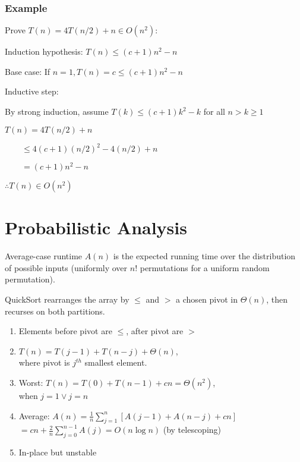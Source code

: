 \documentclass[12pt, a4paper]{article}
\begin{document}
\begin{multicols*}{3}
\subsubsection{Example}

Prove $T(n) = 4T(n /2) + n \in O(n^2)$:\\
\begin{enumproof}
\item Induction hypothesis: $T(n) \leq (c+1)n^2-n$
\item Base case: If $n = 1, T(n) = c \leq (c+1)n^2-n$
\item Inductive step: 
  \begin{enumproof}
  \item By strong induction, assume $T(k) \leq (c+1)k^2-k$ for all $n > k \geq 1$
  \item $T(n) = 4T(n /2) + n$
  \item $\quad\quad \leq 4(c+1)(n /2)^2 - 4(n /2) + n$
  \item $\quad\quad = (c+1)n^2-n$
  \end{enumproof}
\item $\therefore T(n) \in O(n^2)$
\end{enumproof}

\colbreak
\section{Probabilistic Analysis}
Average-case runtime $A(n)$ is the expected running time over the distribution of possible inputs (uniformly over $n!$ permutations for a uniform random permutation).

QuickSort rearranges the array by $\leq$ and $>$ a chosen pivot in $\Theta(n)$, then recurses on both partitions.
\begin{enumerate}[\roman*.]
  \item Elements before pivot are $\leq$, after pivot are $>$
  \item $T(n) = T(j-1)+T(n-j)+\Theta(n)$,\\ where pivot is $j^{th}$ smallest element.
  \item Worst: $T(n) = T(0) + T(n-1) + cn = \Theta(n^2)$,\\ when $j=1 \lor j=n$ 
  \item Average: $A(n) = \frac{1}{n} \sum^n_{j=1}[A(j-1)+A(n-j)+cn]$\\$= cn + \frac{2}{n}\sum^{n-1}_{j=0}A(j) = O(n\log n)$ (by telescoping)
  \item In-place but unstable
\end{enumerate}


\end{multicols*}
\end{document}

